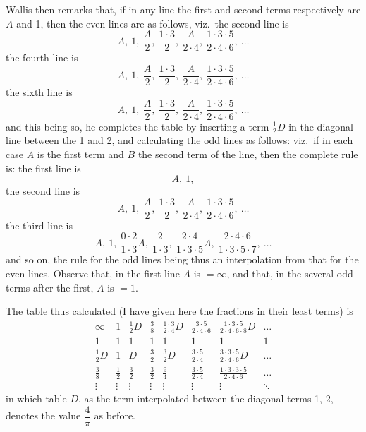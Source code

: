 \documentclass[11pt,a4paper]{article}
\begin{document}
Wallis then remarks that, if in any line the first and second terms respectively are $A$ and 1, then the even lines are as follows, viz.\ the second line is
\[
A,\ 1,\ \frac{A}{2},\ \frac{1 \cdot 3}{2},\ \frac{A}{2 \cdot 4},\ \frac{1 \cdot 3 \cdot 5}{2 \cdot 4 \cdot 6},\ \ldots
\]
the fourth line is
\[
A,\ 1,\ \frac{A}{2},\ \frac{1 \cdot 3}{2},\ \frac{A}{2 \cdot 4},\ \frac{1 \cdot 3 \cdot 5}{2 \cdot 4 \cdot 6},\ \ldots
\]
the sixth line is
\[
A,\ 1,\ \frac{A}{2},\ \frac{1 \cdot 3}{2},\ \frac{A}{2 \cdot 4},\ \frac{1 \cdot 3 \cdot 5}{2 \cdot 4 \cdot 6},\ \ldots
\]
and this being so, he completes the table by inserting a term $\tfrac{1}{2}D$ in the diagonal line between the 1 and 2, and calculating the odd lines as follows: viz.\ if in each case $A$ is the first term and $B$ the second term of the line, then the complete rule is:
the first line is
\[
A,\ 1,
\]
the second line is
\[
A,\ 1,\ \frac{A}{2},\ \frac{1 \cdot 3}{2},\ \frac{A}{2 \cdot 4},\ \frac{1 \cdot 3 \cdot 5}{2 \cdot 4 \cdot 6},\ \ldots
\]
the third line is
\[
A,\ 1,\ \frac{0 \cdot 2}{1 \cdot 3}A,\ \frac{2}{1 \cdot 3},\ \frac{2 \cdot 4}{1 \cdot 3 \cdot 5}A,\ \frac{2 \cdot 4 \cdot 6}{1 \cdot 3 \cdot 5 \cdot 7},\ \ldots
\]
and so on, the rule for the odd lines being thus an interpolation from that for the even lines. Observe that, in the first line $A$ is $= \infty$, and that, in the several odd terms after the first, $A$ is $=1$.

The table thus calculated (I have given here the fractions in their least terms) is
\[
\begin{array}{cccccccc}
\infty & 1 & \tfrac{1}{2}D & \tfrac{3}{8} & \tfrac{1 \cdot 3}{2 \cdot 4}D & \tfrac{3 \cdot 5}{2 \cdot 4 \cdot 6} & \tfrac{1 \cdot 3 \cdot 5}{2 \cdot 4 \cdot 6 \cdot 8}D & \ldots \\
1 & 1 & 1 & 1 & 1 & 1 & 1 & 1 \\
\tfrac{1}{2}D & 1 & D & \tfrac{3}{2} & \tfrac{3}{2}D & \tfrac{3 \cdot 5}{2 \cdot 4} & \tfrac{3 \cdot 3 \cdot 5}{2 \cdot 4 \cdot 6}D & \ldots \\
\tfrac{3}{8} & \tfrac{1}{2} & \tfrac{3}{2} & \tfrac{3}{2} & \tfrac{9}{4} & \tfrac{3 \cdot 5}{2 \cdot 4} & \tfrac{1 \cdot 3 \cdot 3 \cdot 5}{2 \cdot 4 \cdot 6} & \ldots \\
\vdots & \vdots & \vdots & \vdots & \vdots & \vdots & \vdots & \ddots
\end{array}
\]
in which table $D$, as the term interpolated between the diagonal terms 1, 2, denotes the value $\dfrac{4}{\pi}$ as before.
\end{document}
